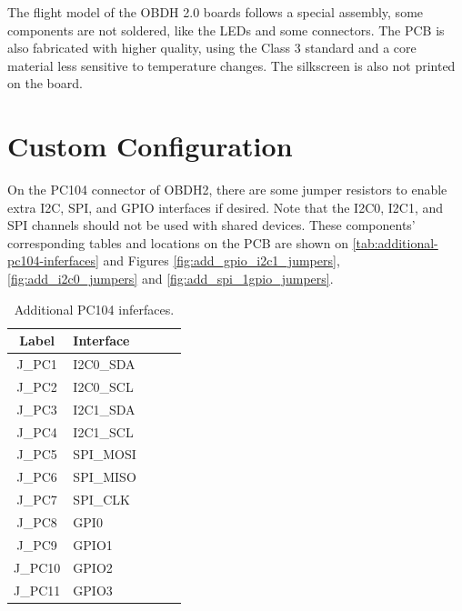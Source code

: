 The flight model of the OBDH 2.0 boards follows a special assembly, some components are not soldered, like the LEDs and some connectors. The PCB is also fabricated with higher quality, using the Class 3 standard and a core material less sensitive to temperature changes. The silkscreen is also not printed on the board.

\section{Custom Configuration}

On the PC104 connector of OBDH2, there are some jumper resistors to enable extra I2C, SPI, and GPIO interfaces if desired. Note that the I2C0, I2C1, and SPI channels should not be used with shared devices. These components' corresponding tables and locations on the PCB are shown on \autoref{tab:additional-pc104-inferfaces} and Figures \ref{fig:add_gpio_i2c1_jumpers}, \ref{fig:add_i2c0_jumpers} and \ref{fig:add_spi_1gpio_jumpers}.

\begin{table}[!ht]
    \centering
    \begin{tabular}{cllll}
        \toprule[1.5pt]
        \textbf{Label} & \textbf{Interface} \\
        \midrule
        J\_PC1            & I2C0\_SDA \\
        J\_PC2            & I2C0\_SCL \\
        J\_PC3            & I2C1\_SDA \\
        J\_PC4            & I2C1\_SCL \\
        J\_PC5            & SPI\_MOSI \\
        J\_PC6            & SPI\_MISO \\
        J\_PC7            & SPI\_CLK \\
        J\_PC8            & GPI0 \\
        J\_PC9            & GPIO1 \\
        J\_PC10           & GPIO2 \\
        J\_PC11           & GPIO3 \\
        \bottomrule[1.5pt]
    \end{tabular}
    \caption{Additional PC104 inferfaces.}
    \label{tab:additional-pc104-inferfaces}
\end{table}

